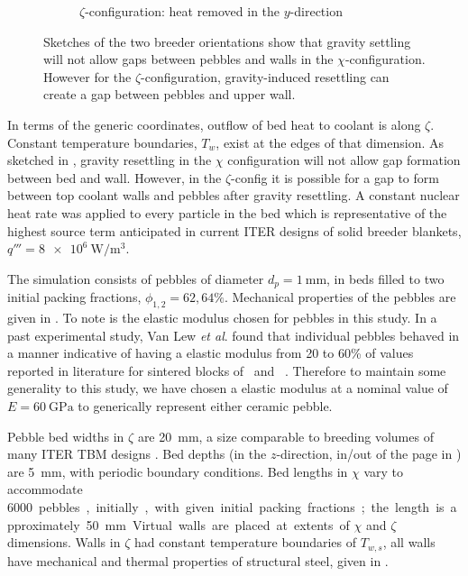 \begin{figure}[!ht]
\begin{subfigure}[b]{0.44\textwidth}
        \caption{$\zeta$-configuration: heat removed in the $y$-direction}\label{fig:y-domain}
    \end{subfigure}
    \caption{Sketches of the two breeder orientations show that gravity settling will not allow gaps between pebbles and walls in the $\chi$-configuration. However for the $\zeta$-configuration, gravity-induced resettling can create a gap between pebbles and upper wall. }\label{fig:domains}
\end{figure}

In terms of the generic coordinates, outflow of bed heat to coolant is along $\zeta$. Constant temperature boundaries, $T_w$, exist at the edges of that dimension. As sketched in , gravity resettling in the $\chi$ configuration will not allow gap formation between bed and wall. However, in the $\zeta$-config it is possible for a gap to form between top coolant walls and pebbles after gravity resettling. A constant nuclear heat rate was applied to every particle in the bed which is representative of the highest source term anticipated in current ITER designs of solid breeder blankets, $q''' = \SI{8e6}{\watt\per\meter\cubed}$.

The simulation consists of pebbles of diameter $d_p = \SI{1}{\milli\meter}$, in beds filled to two initial packing fractions, $\phi_{1,2} = 62, 64\%$. Mechanical properties of the pebbles are given in . To note is the elastic modulus chosen for pebbles in this study. In a past experimental study, Van Lew \textit{et al}. found that individual pebbles behaved in a manner indicative of having a elastic modulus from 20 to 60\% of values reported in literature for sintered blocks of \lit~and \lis~\cite{VanLew2015}. Therefore to maintain some generality to this study, we have chosen a elastic modulus at a nominal value of $E=\SI{60}{\giga\pascal}$ to generically represent either ceramic pebble.

Pebble bed widths in $\zeta$ are \SI{20}{\milli\meter}, a size comparable to breeding volumes of many ITER TBM designs \cite{Hernandez2013,Cho2008,Feng2012a}. Bed depths (in the $z$-direction, in/out of the page in ) are \SI{5}{\milli\meter}, with periodic boundary conditions. Bed lengths in $\chi$ vary to accommodate \SI{6000} pebbles, initially, with given initial packing fractions; the length is approximately \SI{50}{\milli\meter}. Virtual walls are placed at extents of $\chi$ and $\zeta$ dimensions. Walls in $\zeta$ had constant temperature boundaries of $T_{w,s}$, all walls have mechanical and thermal properties of structural steel, given in .

